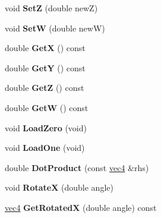\begin{DoxyCompactItemize}
\item 
\hypertarget{classmath_1_1vec4_aadb912679d8bd3a5ea6e40bee3351466}{
void {\bfseries SetZ} (double newZ)}
\label{classmath_1_1vec4_aadb912679d8bd3a5ea6e40bee3351466}

\item 
\hypertarget{classmath_1_1vec4_a1f5cc0d630782b45db821fad154edf74}{
void {\bfseries SetW} (double newW)}
\label{classmath_1_1vec4_a1f5cc0d630782b45db821fad154edf74}

\item 
\hypertarget{classmath_1_1vec4_a38368cb7e4a19770d6fd1b583a4ace7d}{
double {\bfseries GetX} () const }
\label{classmath_1_1vec4_a38368cb7e4a19770d6fd1b583a4ace7d}

\item 
\hypertarget{classmath_1_1vec4_a47c4de53e727a6787ec413788e1c909c}{
double {\bfseries GetY} () const }
\label{classmath_1_1vec4_a47c4de53e727a6787ec413788e1c909c}

\item 
\hypertarget{classmath_1_1vec4_a7e3bb00b0ecd516fa7f6565223e487b5}{
double {\bfseries GetZ} () const }
\label{classmath_1_1vec4_a7e3bb00b0ecd516fa7f6565223e487b5}

\item 
\hypertarget{classmath_1_1vec4_a09943c3c72895bd275a06decc523939d}{
double {\bfseries GetW} () const }
\label{classmath_1_1vec4_a09943c3c72895bd275a06decc523939d}

\item 
\hypertarget{classmath_1_1vec4_a79d0129be0c63351ad9f0189f6a6a785}{
void {\bfseries LoadZero} (void)}
\label{classmath_1_1vec4_a79d0129be0c63351ad9f0189f6a6a785}

\item 
\hypertarget{classmath_1_1vec4_a011c7c6f767904a92218a033a4c37402}{
void {\bfseries LoadOne} (void)}
\label{classmath_1_1vec4_a011c7c6f767904a92218a033a4c37402}

\item 
\hypertarget{classmath_1_1vec4_a3b20323a2ca143d175ab8acc438e0c07}{
double {\bfseries DotProduct} (const \hyperlink{classmath_1_1vec4}{vec4} \&rhs)}
\label{classmath_1_1vec4_a3b20323a2ca143d175ab8acc438e0c07}

\item 
\hypertarget{classmath_1_1vec4_a915cc81b88bc7025db53975364dbe007}{
void {\bfseries RotateX} (double angle)}
\label{classmath_1_1vec4_a915cc81b88bc7025db53975364dbe007}

\item 
\hypertarget{classmath_1_1vec4_a94bb8cc13398780f733f791298431616}{
\hyperlink{classmath_1_1vec4}{vec4} {\bfseries GetRotatedX} (double angle) const }
\label{classmath_1_1vec4_a94bb8cc13398780f733f791298431616}


\end{DoxyCompactItemize}
